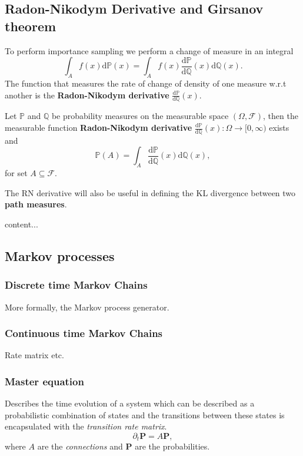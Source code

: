 \subsection{Radon-Nikodym Derivative and Girsanov theorem}
To perform importance sampling we perform a change of measure in an integral
\begin{equation}
	\int_{A} f(x) \mathrm{d} \mathbb{P}(x)=\int_{A} f(x) \frac{\mathrm{d} \mathbb{P}}{\mathrm{d} \mathbb{Q}}(x) \mathrm{d} \mathbb{Q}(x).
\end{equation}
The function that measures the rate of change of density of one measure w.r.t another is the \textbf{Radon-Nikodym derivative} $\frac{\mathrm{d} \mathbb{P}}{\mathrm{d} \mathbb{Q}}(x)$.

\begin{theorem}
	Let $\mathbb{P}$ and $\mathbb{Q}$ be probability measures on the measurable space $(\Omega, \mathcal{F})$, then the measurable function \textbf{Radon-Nikodym derivative} $\frac{\mathrm{d} \mathbb{P}}{\mathrm{d} \mathbb{Q}}(x): \Omega \rightarrow[0, \infty)$ exists and 
	\begin{equation}
		\mathbb{P}(A)=\int_{A} \frac{\mathrm{d} \mathbb{P}}{\mathrm{d} \mathbb{Q}}(x) \mathrm{d} \mathbb{Q}(x),
	\end{equation}
	for set $A \subseteq \mathcal{F}$.
\end{theorem}
The RN derivative will also be useful in defining the KL divergence between two \textbf{path measures}. 

\begin{theorem}
	content...
\end{theorem}


\subsection{Markov processes}

\subsubsection{Discrete time Markov Chains}
More formally, the Markov process generator.

\subsubsection{Continuous time Markov Chains}
Rate matrix etc.

\subsubsection{Master equation}
Describes the time evolution of a system which can be described as a probabilistic combination of states and the transitions between these states is encapsulated with the \emph{transition rate matrix}.
\begin{equation}
	\partial_{t} \mathbf{P} = A \mathbf{P},
\end{equation}
where $A$ are the \emph{connections} and $\mathbf{P}$ are the probabilities.  

